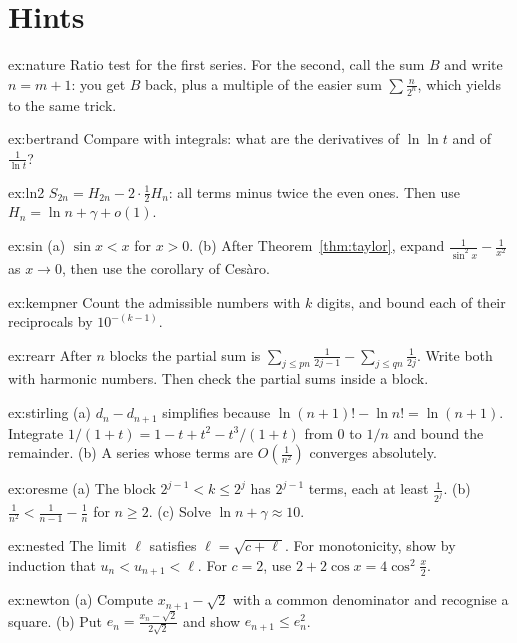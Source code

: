 \section{Hints}

\begin{hint}{ex:nature}
Ratio test for the first series. For the second, call the sum $B$ and write $n=m+1$: you get $B$ back, plus a multiple of the easier sum $\sum\frac n{2^n}$, which yields to the same trick.
\end{hint}
\begin{hint}{ex:bertrand}
Compare with integrals: what are the derivatives of $\ln\ln t$ and of $\frac1{\ln t}$?
\end{hint}
\begin{hint}{ex:ln2}
$S_{2n}=H_{2n}-2\cdot\frac12H_n$: all terms minus twice the even ones. Then use $H_n=\ln n+\gamma+o(1)$.
\end{hint}
\begin{hint}{ex:sin}
(a) $\sin x<x$ for $x>0$. (b) After Theorem~\ref{thm:taylor}, expand $\frac1{\sin^2x}-\frac1{x^2}$ as $x\to0$, then use the corollary of Ces\`aro.
\end{hint}
\begin{hint}{ex:kempner}
Count the admissible numbers with $k$ digits, and bound each of their reciprocals by $10^{-(k-1)}$.
\end{hint}
\begin{hint}{ex:rearr}
After $n$ blocks the partial sum is $\sum_{j\le pn}\frac1{2j-1}-\sum_{j\le qn}\frac1{2j}$. Write both with harmonic numbers. Then check the partial sums inside a block.
\end{hint}
\begin{hint}{ex:stirling}
(a) $d_n-d_{n+1}$ simplifies because $\ln(n+1)!-\ln n!=\ln(n+1)$.
Integrate $1/(1+t)=1-t+t^2-t^3/(1+t)$ from $0$ to $1/n$ and bound the remainder. (b) A series whose terms are $O\left(\frac1{n^2}\right)$ converges absolutely.
\end{hint}
\begin{hint}{ex:oresme}
(a) The block $2^{j-1}<k\le2^j$ has $2^{j-1}$ terms, each at least $\frac1{2^j}$. (b) $\frac1{n^2}<\frac1{n-1}-\frac1n$ for $n\ge2$. (c) Solve $\ln n+\gamma\approx10$.
\end{hint}
\begin{hint}{ex:nested}
The limit $\ell$ satisfies $\ell=\sqrt{c+\ell}$. For monotonicity, show by induction that $u_n<u_{n+1}<\ell$. For $c=2$, use $2+2\cos x=4\cos^2\frac x2$.
\end{hint}
\begin{hint}{ex:newton}
(a) Compute $x_{n+1}-\sqrt2$ with a common denominator and recognise a square. (b) Put $e_n=\frac{x_n-\sqrt2}{2\sqrt2}$ and show $e_{n+1}\le e_n^2$.
\end{hint}
